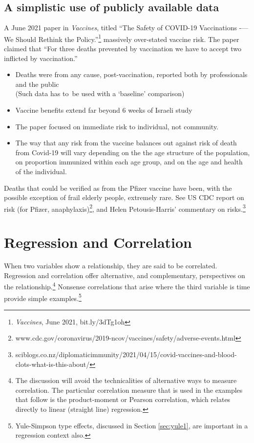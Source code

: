 \documentclass[
  10ptls,
  b5paper]{book}
\providecommand{\tightlist}{%
  \setlength{\itemsep}{0pt}\setlength{\parskip}{0pt}}
\begin{document}
\section{A simplistic use of publicly available data}\label{a-simplistic-use-of-publicly-available-data}

A June 2021 paper in \emph{Vaccines}, titled ``The Safety of COVID-19 Vaccinations -\/--- We Should Rethink the Policy.''\footnote{\emph{Vaccines}, June 2021, bit.ly/3dTg1oh} massively over-stated vaccine risk. The paper claimed that ``For three deaths prevented by vaccination we have to accept two inflicted by vaccination.''

\begin{itemize}
\tightlist
\item
  Deaths were from any cause, post-vaccination, reported both by professionals and the public\\
  (Such data has to~be used with a `baseline' comparison)
\item
  Vaccine benefits extend far beyond 6 weeks of Israeli study
\item
  The paper focused on immediate risk to individual, not community.
\item
  The way that any risk from the vaccine balances out against risk of death from Covid-19 will vary depending on the the age structure of the population, on proportion immunized within each age group, and on the age and health of the individual.
\end{itemize}

Deaths that could be verified as from the Pfizer vaccine have been, with the possible exception of frail elderly people, extremely rare. See US CDC report on risk (for Pfizer, anaphylaxis)\footnote{www.cdc.gov/coronavirus/2019-ncov/vaccines/safety/adverse-events.html}, and Helen Petousis-Harris' commentary on risks.\footnote{sciblogs.co.nz/diplomaticimmunity/2021/04/15/covid-vaccines-and-blood-clots-what-is-this-about/}

\chapter{Regression and Correlation}\label{sec:reg}

When two variables show a relationship, they are said to be correlated. Regression and correlation offer alternative, and complementary, perspectives on the relationship.\footnote{The discussion will avoid the technicalities of alternative ways to measure correlation. The particular correlation measure that is used in the examples that follow is the product-moment or Pearson correlation, which relates directly to linear (straight line) regression.} Nonsense correlations that arise where the third variable is time provide simple examples.\footnote{Yule-Simpson type effects, discussed in Section \ref{sec:yule1}, are important in a regression context also.}
\end{document}
